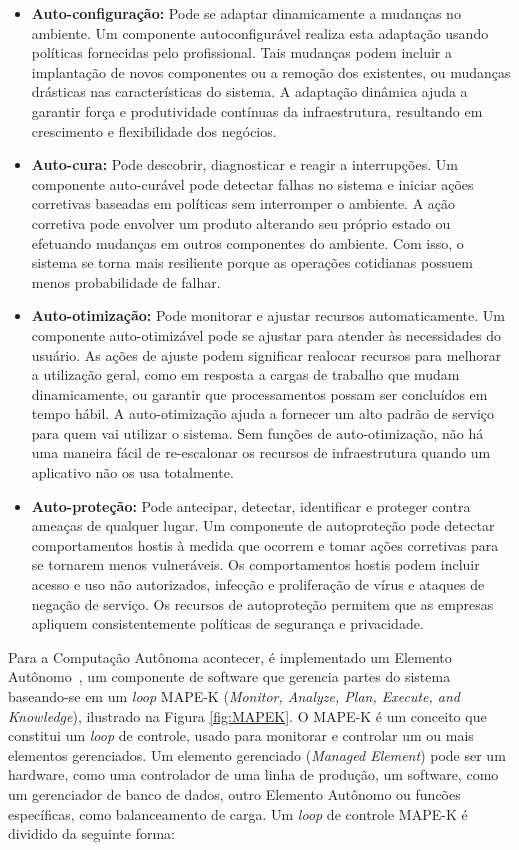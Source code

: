 \documentclass[Portugues,Final]{ic-tese-v3}
\begin{document}
\begin{itemize}
\item \textbf{Auto-configuração:} Pode se adaptar dinamicamente a mudanças no ambiente. Um componente autoconfigurável realiza esta adaptação usando políticas fornecidas pelo profissional. Tais mudanças podem incluir a implantação de novos componentes ou a remoção dos existentes, ou mudanças drásticas nas características do sistema. A adaptação dinâmica ajuda a garantir força e produtividade contínuas da infraestrutura, resultando em crescimento e flexibilidade dos negócios.
\item \textbf{Auto-cura:} Pode descobrir, diagnosticar e reagir a interrupções. Um componente auto-curável pode detectar falhas no sistema e iniciar ações corretivas baseadas em políticas sem interromper o ambiente. A ação corretiva pode envolver um produto alterando seu próprio estado ou efetuando mudanças em outros componentes do ambiente. Com isso, o sistema se torna mais resiliente porque as operações cotidianas possuem menos probabilidade de falhar.
\item \textbf{Auto-otimização:} Pode monitorar e ajustar recursos automaticamente. Um componente auto-otimizável pode se ajustar para atender às necessidades do usuário. As ações de ajuste podem significar realocar recursos para melhorar a utilização geral, como em resposta a cargas de trabalho que mudam dinamicamente, ou garantir que processamentos possam ser concluídos em tempo hábil. A auto-otimização ajuda a fornecer um alto padrão de serviço para quem vai utilizar o sistema. Sem funções de auto-otimização, não há uma maneira fácil de re-escalonar os recursos de infraestrutura quando um aplicativo não os usa totalmente.
\item \textbf{Auto-proteção:} Pode antecipar, detectar, identificar e proteger contra ameaças de qualquer lugar. Um componente de autoproteção pode detectar comportamentos hostis à medida que ocorrem e tomar ações corretivas para se tornarem menos vulneráveis. Os comportamentos hostis podem incluir acesso e uso não autorizados, infecção e proliferação de vírus e ataques de negação de serviço. Os recursos de autoproteção permitem que as empresas apliquem consistentemente políticas de segurança e privacidade.
\end{itemize}

Para a Computação Autônoma acontecer, é implementado um Elemento Autônomo~\cite{Abbas_2010}, um componente de software que gerencia partes do sistema baseando-se em um \textit{loop} MAPE-K (\textit{Monitor, Analyze, Plan, Execute, and Knowledge}), ilustrado na Figura \ref{fig:MAPEK}. O MAPE-K é um conceito que constitui um \textit{loop} de controle, usado para monitorar e controlar um ou mais elementos gerenciados. Um elemento gerenciado (\textit{Managed Element}) pode ser um hardware, como uma controlador de uma linha de produção, um software, como um gerenciador de banco de dados, outro Elemento Autônomo ou funcões específicas, como balanceamento de carga. Um \textit{loop} de controle MAPE-K é dividido da seguinte forma:
\end{document}
